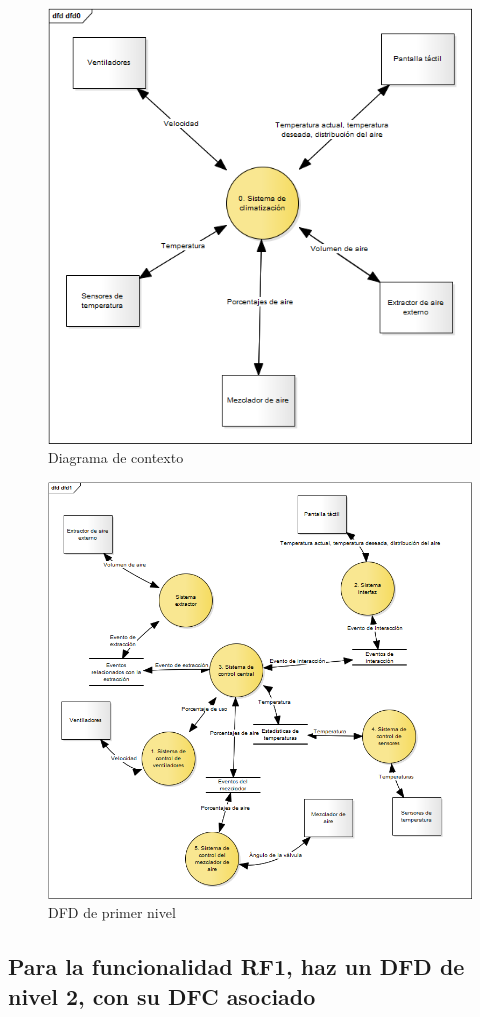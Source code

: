 \begin{figure}[H]
  \centering
  \includegraphics[width=0.8\linewidth]{Resources/dfd0.png}
  \caption{Diagrama de contexto}
  \label{fig:dfd0}
\end{figure}
\begin{figure}[H]
  \centering
  \includegraphics[width=0.8\linewidth]{Resources/dfd1.png}
  \caption{DFD de primer nivel}
  \label{fig:dfd1}
\end{figure}

\subsection{Para la funcionalidad RF1, haz un DFD de nivel 2, con su DFC asociado}


